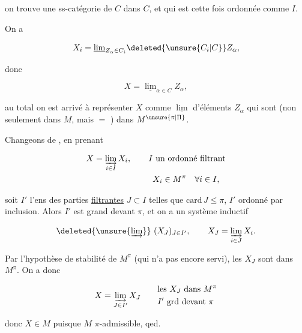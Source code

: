 
on trouve une ss-catégorie de $C$  dans $C$, et qui est cette fois ordonnée  comme $I$.

On a

\[
X_i=\underline{\lim}_{Z_\alpha\in C_i}\deleted{\unsure{C_i|C}}Z_\alpha,
\]

 donc

\[
X=\underline{\lim}_{\alpha\in C}Z_\alpha,
\]

au total on est arrivé à représenter $X$ comme $\underline{\lim}$  d'éléments $Z_\alpha$ qui sont (non seulement dans $M$, mais $=$ ) dans $M^{\unsure{\pi|\Pi}}$.

Changeons de , en prenant

\[
\begin{aligned}
 X&=\varinjlim_{i\in I}X_i,\qquad I\ \text{un ordonné filtrant}\\
 &\hspace{5em}\qquad X_i\in M^\pi\quad\forall i\in I,
\end{aligned}
\]

soit $I'$ l'ens  des parties \uline{filtrantes} $J\subset I$ telles que $\mathrm{card}\,J\leq\pi$, $I'$ ordonné par inclusion. Alors $I'$ est grand devant $\pi$, et on a un système inductif

\[
\deleted{\unsure{\varinjlim}}\ (X_J)_{J\in I'},\qquad X_J=\varinjlim_{i\in J}X_i.
\]

Par l'hypothèse de stabilité de $M^\pi$ (qui n'a pas encore servi), les $X_J$ sont dans $M^\pi$. On a donc

\[
X=\varinjlim_{J\in I'}X_J \qquad
\begin{aligned}
 &\text{les $X_J$ dans $M^\pi$}\\
 &\text{$I'$ grd devant $\pi$}
\end{aligned}
\]

donc $X\in M$ puisque $M$ $\pi$-admissible, qed.

